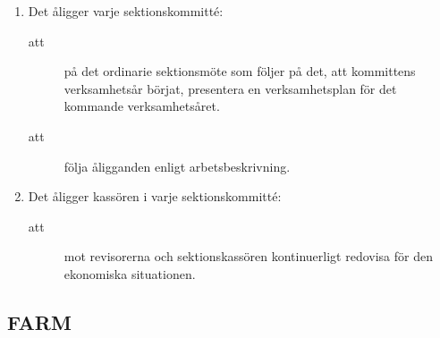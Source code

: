 \documentclass[11pt,a4paper]{article}
\begin{document}
\begin{enumerate}[\thesubsection .1]

  \item Det åligger varje sektionskommitté:
    \begin{description}
    \item[att] på det ordinarie sektionsmöte som följer på det, att kommittens verksamhetsår börjat, presentera en verksamhetsplan för det kommande verksamhetsåret.     
     \item[att] följa åligganden enligt arbetsbeskrivning. 
    \end{description}


  \item Det åligger kassören i varje sektionskommitté:
    \begin{description}
      \item[att]  mot revisorerna och sektionskassören kontinuerligt redovisa för den ekonomiska situationen.
       \end{description}
\end{enumerate}

\subsection{FARM}
\end{document}
